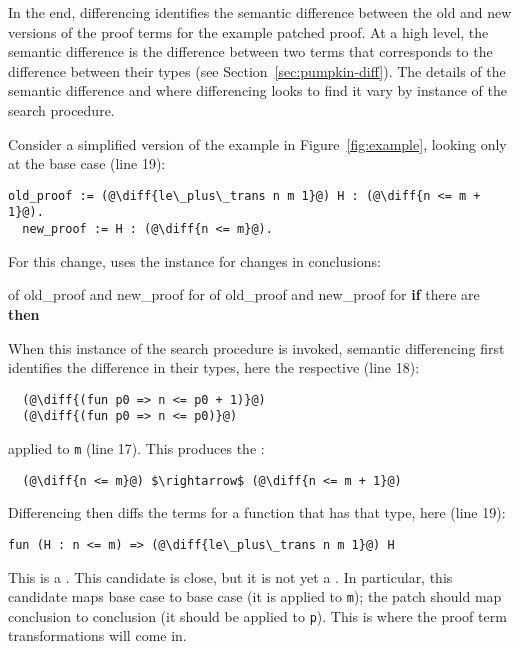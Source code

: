 In the end, differencing identifies the semantic difference between the old and new versions of the proof terms for the example patched proof.
At a high level, the semantic difference is the difference between two terms that corresponds to the 
difference between their types (see Section~\ref{sec:pumpkin-diff}).
The details of the semantic difference and where differencing looks to find it vary by instance of the search procedure.

Consider a simplified version of the example in Figure~\ref{fig:example}, 
looking only at the base case (line 19):

\begin{lstlisting}[language=coq]
  old_proof := (@\diff{le\_plus\_trans n m 1}@) H : (@\diff{n <= m + 1}@).
  new_proof := H : (@\diff{n <= m}@).
\end{lstlisting}
For this change, \sysname uses the instance for changes in conclusions:

\begin{algorithm}
\footnotesize
\begin{algorithmic}[1]
    \STATE {}  of old\_proof and new\_proof for 
    \STATE {}  of old\_proof and new\_proof for 
    \STATE \textbf{if} there are  \textbf{then}
    \STATE \hspace*{1em}  
\end{algorithmic}
\end{algorithm}
When this instance of the search procedure is invoked,
semantic differencing first identifies the difference in their types, here the respective  (line 18):

\begin{lstlisting}
  (@\diff{(fun p0 => n <= p0 + 1)}@)
  (@\diff{(fun p0 => n <= p0)}@)
\end{lstlisting}
applied to \lstinline{m} (line 17).
This produces the  :

\begin{lstlisting}
  (@\diff{n <= m}@) $\rightarrow$ (@\diff{n <= m + 1}@)
\end{lstlisting}
Differencing then diffs the terms for a function that has that type, here (line 19):

\begin{lstlisting}[language=coq]
  fun (H : n <= m) => (@\diff{le\_plus\_trans n m 1}@) H
\end{lstlisting}
This is a .
This candidate is close, but it is not yet a . In particular, this candidate
maps base case to base case (it is applied to \lstinline{m}); the patch should map conclusion to conclusion (it should
be applied to \lstinline{p}).
This is where the proof term transformations will come in.

